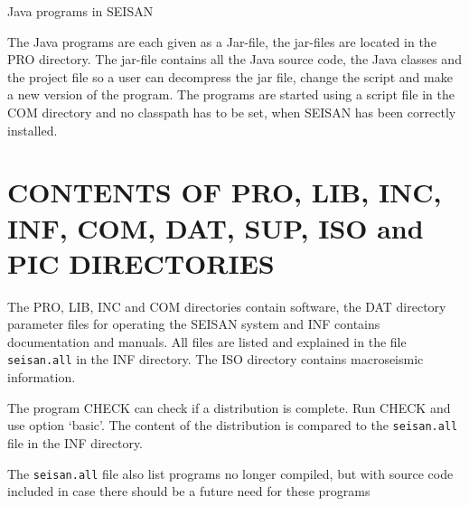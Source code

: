 Java programs in SEISAN 

The Java programs are each given as a Jar-file,
the jar-files are located in the PRO directory. The jar-file contains 
all the Java source code, the Java classes and the project file so 
a user can decompress the jar file, change the script and make a 
new version of the program. The programs are started using a script 
file in the COM directory and no classpath has to be set, when SEISAN 
has been correctly installed.  

\section{CONTENTS OF PRO, LIB, INC, INF, COM, DAT, SUP, ISO and PIC DIRECTORIES}

The PRO, LIB, INC and COM directories contain software, the DAT 
directory parameter files for operating the SEISAN system and INF 
contains documentation and manuals. All files are listed and explained 
in the file \texttt{seisan.all} in the INF directory. 
The ISO directory contains macroseismic information. 

The program CHECK can check if a distribution is 
complete. Run CHECK and use option `basic'. The content of the 
distribution is compared to the \texttt{seisan.all} file in the INF directory. 

The \texttt{seisan.all} file also list programs no longer 
compiled, but with source code included in case there should 
be a future need for these programs 

